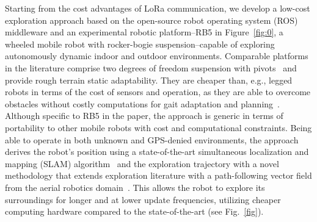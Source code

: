 \documentclass[lettersize,journal,twoside]{IEEEtran}
\theoremstyle{definition}
\begin{document}
Starting from the cost advantages of LoRa communication, we develop a low-cost %
exploration approach based on the open-source robot operating system (ROS) middleware %
and an experimental robotic platform--RB5 in Figure~\ref{fig:0}, a wheeled mobile robot with rocker-bogie suspension--capable of exploring autonomously dynamic indoor and outdoor environments.
Comparable platforms in the literature comprise two degrees of freedom suspension with pivots~\cite{setterfield2013terrain,%
faisal2021low} and provide rough terrain static adaptability. %
They are cheaper than, e.g., legged robots in terms of the cost of sensors %
and operation, as they are able to overcome obstacles without costly computations for gait adaptation and planning~\cite{muller2021openbot}.
Although specific to RB5 in the paper, the approach is generic in terms of portability to other mobile robots with cost and computational constraints.
Being able to operate in both unknown and GPS-denied environments, the %
approach derives the robot's 
position using a state-of-the-art simultaneous localization and mapping (SLAM) algorithm~\cite{labbe2019rtab} %
and the exploration trajectory with a novel methodology that extends exploration literature with a path-following vector field %
from the aerial robotics domain~\cite{seewald2022energy,garcia2017guidance,seewaldphdthesis}. This allows the robot to explore its surroundings for longer and at lower update frequencies, %
utilizing cheaper computing hardware compared to the state-of-the-art (see Fig.~\ref{fig}).%
\end{document}
